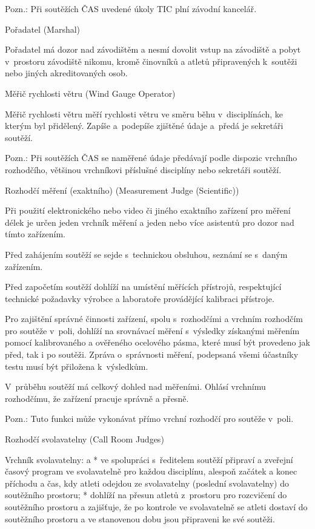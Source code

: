 Pozn.: Při soutěžích ČAS uvedené úkoly TIC  plní závodní kancelář.
\enditems

\secc Pořadatel (Marshal)

Pořadatel má dozor nad závodištěm a nesmí dovolit vstup na závodiště a pobyt v~prostoru závodiště nikomu, kromě činovníků a atletů připravených k~soutěži nebo jiných akreditovaných osob.

\secc Měřič rychlosti větru (Wind Gauge Operator)

Měřič rychlosti větru měří rychlosti větru ve směru běhu v~disciplínách, ke kterým byl přidělený.
Zapíše a~podepíše zjištěné údaje a~předá je sekretáři soutěží.

Pozn.: Při soutěžích ČAS se naměřené údaje předávají podle dispozic vrchního rozhodčího, většinou vrchníkovi příslušné disciplíny nebo sekretáři soutěží.

\secc Rozhodčí měření (exaktního) (Measurement Judge (Scientific))

Při použití elektronického nebo video či jiného exaktního zařízení pro měření délek je určen jeden vrchník měření a jeden nebo více asistentů pro dozor nad tímto zařízením.

Před zahájením soutěží se sejde s~technickou obsluhou, seznámí se s~daným zařízením.

Před započetím soutěží dohlíží na umístění měřících přístrojů, respektující technické požadavky výrobce a laboratoře provádějící kalibraci přístroje.

Pro zajištění správné činnosti zařízení, spolu s~rozhodčími a vrchním rozhodčím pro soutěže v~poli, dohlíží na srovnávací měření s~výsledky získanými měřením pomocí kalibrovaného a ověřeného ocelového pásma, které musí být provedeno jak před, tak i po soutěži.
Zpráva o~správnosti měření, podepsaná všemi účastníky testu musí být přiložena k~výsledkům.

V~průběhu soutěží má celkový dohled nad měřeními.
Ohlásí vrchnímu rozhodčímu, že zařízení pracuje správně a přesně.

Pozn.: Tuto funkci může vykonávat přímo vrchní rozhodčí pro soutěže v~poli.

\secc Rozhodčí svolavatelny (Call Room Judges)

Vrchník svolavatelny:
\begitems \style a
* ve spolupráci s~ředitelem soutěží připraví a zveřejní časový program ve svolavatelně pro každou disciplínu, alespoň začátek a konec příchodu a čas, kdy atleti odejdou ze svolavatelny (poslední svolavatelny) do soutěžního prostoru;
* dohlíží na přesun atletů z~prostoru pro rozcvičení do soutěžního prostoru a zajišťuje, že po kontrole ve svolavatelně se atleti dostaví do soutěžního prostoru a ve stanovenou dobu jsou připraveni ke své soutěži.
\enditems

